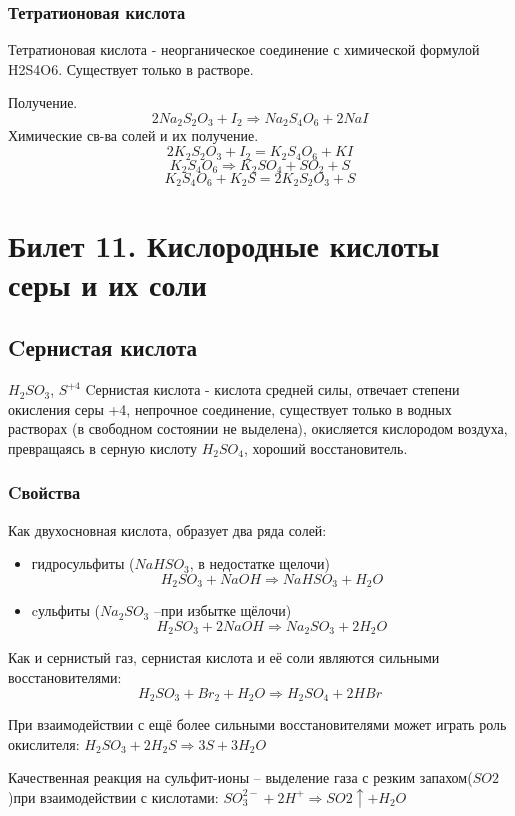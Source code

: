 \documentclass[11pt]{article}
\begin{document}
\subsubsection{Тетратионовая кислота}
Тетратионовая кислота - неорганическое соединение с химической формулой H2S4O6.
Существует только в растворе.

Получение.
$$2Na_2S_2O_3 + I _2 \Rightarrow Na_2S_4O_6 + 2NaI$$
Химические св-ва солей и их получение.
 $$2K_2S_2O_3 + I_2 = K_2S_4O_6 + KI$$
 $$K_2S_4O_6 \Rightarrow K_2SO_4 + SO_2 + S$$
 $$K_2S_4O_6 + K_2S = 2K_2S_2O_3 + S$$




\section{Билет 11. Кислородные кислоты серы и их соли}

\subsection{Cернистая кислота}
$H_2SO_3$, $S^{+4}$
Cернистая кислота - кислота средней силы, отвечает степени окисления серы +4, непрочное
соединение, существует только в водных растворах (в свободном состоянии не выделена), окисляется
кислородом воздуха, превращаясь в серную кислоту $H_2SO_4$, хороший восстановитель.
\subsubsection{Cвойства}
Как двухосновная кислота, образует два ряда солей:
\begin{itemize}
\item гидросульфиты ($NaHSO_3$, в недостатке щелочи) $$H_2SO_3 + NaOH \Rightarrow NaHSO_3 + H_2O$$
\item cульфиты ($Na_2SO_3$ –при избытке щёлочи) $$H_2SO_3 + 2NaOH \Rightarrow Na_2SO_3 + 2H_2O$$
\end{itemize}

Как и сернистый газ, сернистая кислота и её соли являются сильными восстановителями:
$$H_2SO_3 + Br_2 + H_2O \Rightarrow H_2SO_4 + 2HBr$$

При взаимодействии с ещё более сильными восстановителями может играть роль окислителя:
$H_2SO_3 + 2H_2S \Rightarrow 3S + 3H_2O$

Качественная реакция на сульфит-ионы – выделение газа с резким запахом($SO2$)при взаимодействии с кислотами:
$SO_3^{2-} + 2H^+ \Rightarrow SO2 \uparrow + H_2O$
\end{document}
